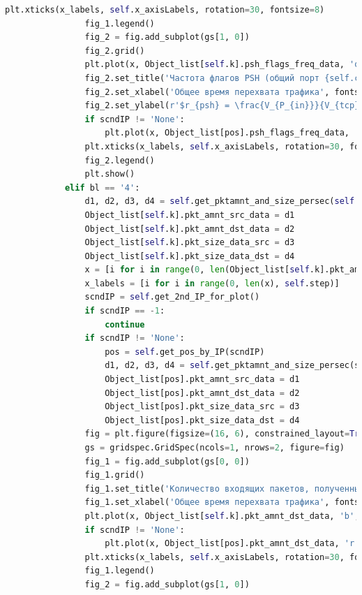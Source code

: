 \documentclass[spec, och, diploma]{SCWorks}
\begin{document}
\begin{lstlisting}[language=Python]
                plt.xticks(x_labels, self.x_axisLabels, rotation=30, fontsize=8)
                fig_1.legend()
                fig_2 = fig.add_subplot(gs[1, 0])
                fig_2.grid()
                plt.plot(x, Object_list[self.k].psh_flags_freq_data, 'orange', label=self.curIP)
                fig_2.set_title('Частота флагов PSH (общий порт {self.curPort})', fontsize=15 )
                fig_2.set_xlabel('Общее время перехвата трафика', fontsize=15)
                fig_2.set_ylabel(r'$r_{psh} = \frac{V_{P_{in}}}{V_{tcp}}$', fontsize=15)
                if scndIP != 'None':
                    plt.plot(x, Object_list[pos].psh_flags_freq_data, 'g', label=scndIP)
                plt.xticks(x_labels, self.x_axisLabels, rotation=30, fontsize=8)
                fig_2.legend()
                plt.show()
            elif bl == '4':
                d1, d2, d3, d4 = self.get_pktamnt_and_size_persec(self.curIP)
                Object_list[self.k].pkt_amnt_src_data = d1
                Object_list[self.k].pkt_amnt_dst_data = d2
                Object_list[self.k].pkt_size_data_src = d3
                Object_list[self.k].pkt_size_data_dst = d4
                x = [i for i in range(0, len(Object_list[self.k].pkt_amnt_src_data))]
                x_labels = [i for i in range(0, len(x), self.step)]
                scndIP = self.get_2nd_IP_for_plot()
                if scndIP == -1:
                    continue
                if scndIP != 'None':
                    pos = self.get_pos_by_IP(scndIP)
                    d1, d2, d3, d4 = self.get_pktamnt_and_size_persec(scndIP)
                    Object_list[pos].pkt_amnt_src_data = d1
                    Object_list[pos].pkt_amnt_dst_data = d2
                    Object_list[pos].pkt_size_data_src = d3
                    Object_list[pos].pkt_size_data_dst = d4
                fig = plt.figure(figsize=(16, 6), constrained_layout=True)
                gs = gridspec.GridSpec(ncols=1, nrows=2, figure=fig)
                fig_1 = fig.add_subplot(gs[0, 0])
                fig_1.grid()
                fig_1.set_title('Количество входящих пакетов, полученных за единицу времени (общий порт {self.curPort})', fontsize=15 )
                fig_1.set_xlabel('Общее время перехвата трафика', fontsize=15)
                plt.plot(x, Object_list[self.k].pkt_amnt_dst_data, 'b', label=self.curIP)
                if scndIP != 'None':
                    plt.plot(x, Object_list[pos].pkt_amnt_dst_data, 'r', label=scndIP)
                plt.xticks(x_labels, self.x_axisLabels, rotation=30, fontsize=8)
                fig_1.legend()
                fig_2 = fig.add_subplot(gs[1, 0])

\end{lstlisting}
\end{document}

